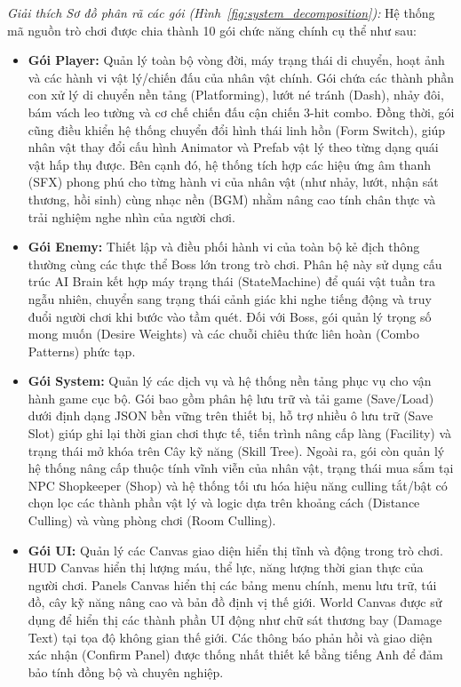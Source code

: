 \documentclass[../DoAn.tex]{subfiles}
\begin{document}
\textit{Giải thích Sơ đồ phân rã các gói (Hình~\ref{fig:system_decomposition}):}
Hệ thống mã nguồn trò chơi được chia thành 10 gói chức năng chính cụ thể như sau:
\begin{itemize}
    \item \textbf{Gói Player:} Quản lý toàn bộ vòng đời, máy trạng thái di chuyển, hoạt ảnh và các hành vi vật lý/chiến đấu của nhân vật chính. Gói chứa các thành phần con xử lý di chuyển nền tảng (Platforming), lướt né tránh (Dash), nhảy đôi, bám vách leo tường và cơ chế chiến đấu cận chiến 3-hit combo. Đồng thời, gói cũng điều khiển hệ thống chuyển đổi hình thái linh hồn (Form Switch), giúp nhân vật thay đổi cấu hình Animator và Prefab vật lý theo từng dạng quái vật hấp thụ được. Bên cạnh đó, hệ thống tích hợp các hiệu ứng âm thanh (SFX) phong phú cho từng hành vi của nhân vật (như nhảy, lướt, nhận sát thương, hồi sinh) cùng nhạc nền (BGM) nhằm nâng cao tính chân thực và trải nghiệm nghe nhìn của người chơi.
    \item \textbf{Gói Enemy:} Thiết lập và điều phối hành vi của toàn bộ kẻ địch thông thường cùng các thực thể Boss lớn trong trò chơi. Phân hệ này sử dụng cấu trúc AI Brain kết hợp máy trạng thái (StateMachine) để quái vật tuần tra ngẫu nhiên, chuyển sang trạng thái cảnh giác khi nghe tiếng động và truy đuổi người chơi khi bước vào tầm quét. Đối với Boss, gói quản lý trọng số mong muốn (Desire Weights) và các chuỗi chiêu thức liên hoàn (Combo Patterns) phức tạp.
    \item \textbf{Gói System:} Quản lý các dịch vụ và hệ thống nền tảng phục vụ cho vận hành game cục bộ. Gói bao gồm phân hệ lưu trữ và tải game (Save/Load) dưới định dạng JSON bền vững trên thiết bị, hỗ trợ nhiều ô lưu trữ (Save Slot) giúp ghi lại thời gian chơi thực tế, tiến trình nâng cấp làng (Facility) và trạng thái mở khóa trên Cây kỹ năng (Skill Tree). Ngoài ra, gói còn quản lý hệ thống nâng cấp thuộc tính vĩnh viễn của nhân vật, trạng thái mua sắm tại NPC Shopkeeper (Shop) và hệ thống tối ưu hóa hiệu năng culling tắt/bật có chọn lọc các thành phần vật lý và logic dựa trên khoảng cách (Distance Culling) và vùng phòng chơi (Room Culling).
    \item \textbf{Gói UI:} Quản lý các Canvas giao diện hiển thị tĩnh và động trong trò chơi. HUD Canvas hiển thị lượng máu, thể lực, năng lượng thời gian thực của người chơi. Panels Canvas hiển thị các bảng menu chính, menu lưu trữ, túi đồ, cây kỹ năng nâng cao và bản đồ định vị thế giới. World Canvas được sử dụng để hiển thị các thành phần UI động như chữ sát thương bay (Damage Text) tại tọa độ không gian thế giới. Các thông báo phản hồi và giao diện xác nhận (Confirm Panel) được thống nhất thiết kế bằng tiếng Anh để đảm bảo tính đồng bộ và chuyên nghiệp.

\end{itemize}
\end{document}
